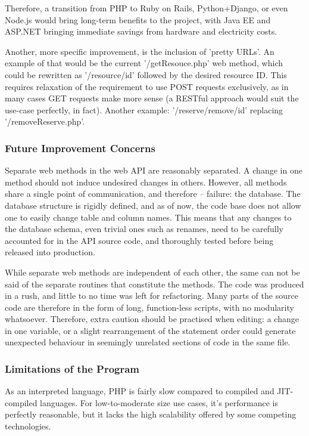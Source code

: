 	Therefore, a transition from PHP to Ruby on Rails, Python+Django, or even 
	Node.js would bring long-term benefits to the project, with Java EE and 
	ASP.NET bringing immediate savings from hardware and electricity costs.
	
	Another, more specific improvement, is the inclusion of 'pretty URLs'.
	An example of that would be the current '/getResouce.php' web method, which 
	could be rewritten as '/resource/{id}' followed by the desired resource ID.
	This requires relaxation of the requirement to use POST requests 
	exclusively, as in many cases GET requests make more sense (a RESTful 
	approach would suit the use-case perfectly, in fact).
	Another example: '/reserve/remove/{id}' replacing '/removeReserve.php'.

    \subsubsection{Future Improvement Concerns}

	Separate web methods in the web API are reasonably separated. A change
	in one method should not induce undesired changes in others. However, all
	methods share a single point of communication, and therefore -- failure:
	the database. The database structure is rigidly defined, and as of now,
	the code base does not allow one to easily change table and column names.
	This means that any changes to the database schema, even trivial ones such
	as renames, need to be carefully accounted for in the API source code, and
	thoroughly tested before being released into production.
	
	While separate web methods are independent of each other, the same can not
	be said of the separate routines that constitute the methods. The code was
	produced in a rush, and little to no time was left for refactoring. Many
	parts of the source code are therefore in the form of long, function-less
	scripts, with no modularity whatsoever. Therefore, extra caution should be
	practised when editing: a change in one variable, or a slight rearrangement
	of the statement order could generate unexpected behaviour in seemingly 
	unrelated sections of code in the same file.

    \subsubsection{Limitations of the Program}
	As an interpreted language, PHP is fairly slow compared to compiled and
	JIT-compiled languages. For low-to-moderate size use cases, it's performance
	is perfectly reasonable, but it lacks the high scalability offered by some
	competing technologies. 
	
